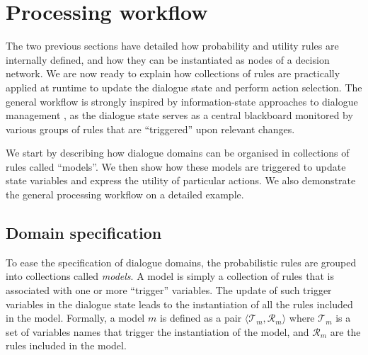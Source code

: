 \section{Processing workflow}
\label{sec:processing-workflow}

The two previous sections have detailed how probability and utility rules are internally defined, and how they can be instantiated as nodes of a decision network. We are now ready to explain how collections of rules are practically applied at runtime to update the dialogue state and perform action selection. The general workflow is strongly inspired by information-state approaches to dialogue management \citep{Larsson:2000:ISD:973935.973943,Buckley:2006}, as the dialogue state serves as a central blackboard monitored by various groups of rules that are ``triggered'' upon relevant changes. 

We start by describing how dialogue domains can be organised in collections of rules called ``models''. We then show how these models are triggered to update state variables and express the utility of particular actions. We also demonstrate the general processing workflow on a detailed example. 


\subsection{Domain specification}

To ease the specification of dialogue domains, the probabilistic rules are grouped into collections called \textit{models}.  A model is simply a collection of rules that is associated with one or more ``trigger'' variables.  The update of such trigger variables in the dialogue state leads to the instantiation of all the rules included in the model. Formally, a model $m$ is defined as a pair $\langle \mathcal{T}_m, \mathcal{R}_m \rangle$ where $\mathcal{T}_m$ is a set of variables names that trigger the instantiation of the model, and $\mathcal{R}_m$ are the rules included in the model.

